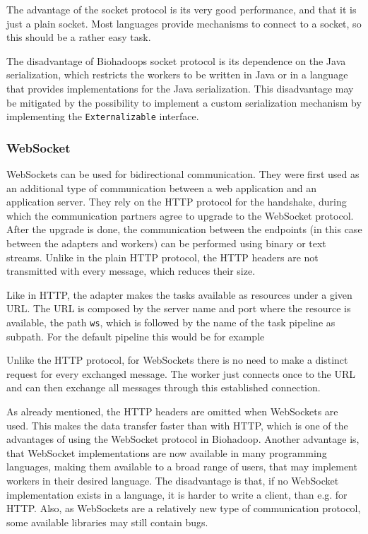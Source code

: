       The advantage of the socket protocol is its very good performance, and that it is just a plain socket. Most languages provide mechanisms to connect to a socket, so this should be a rather easy task.
      
      The disadvantage of Biohadoops socket protocol is its dependence on the Java serialization, which restricts the workers to be written in Java or in a language that provides implementations for the Java serialization. This disadvantage may be mitigated by the possibility to implement a custom serialization mechanism by implementing the \texttt{Externalizable} interface.
    \subsubsection{WebSocket}
      WebSockets can be used for bidirectional communication. They were first used as an additional type of communication between a web application and an application server. They rely on the HTTP protocol for the handshake, during which the communication partners agree to upgrade to the WebSocket protocol. After the upgrade is done, the communication between the endpoints (in this case between the adapters and workers) can be performed using binary or text streams. Unlike in the plain HTTP protocol, the HTTP headers are not transmitted with every message, which reduces their size.
      
      Like in HTTP, the adapter makes the tasks available as resources under a given URL. The URL is composed by the server name and port where the resource is available, the path \texttt{ws}, which is followed by the name of the task pipeline as subpath. For the default pipeline this would be for example 
      
      Unlike the HTTP protocol, for WebSockets there is no need to make a distinct request for every exchanged message. The worker just connects once to the URL and can then exchange all messages through this established connection.

      As already mentioned, the HTTP headers are omitted when WebSockets are used. This makes the data transfer faster than with HTTP, which is one of the advantages of using the WebSocket protocol in Biohadoop. Another advantage is, that WebSocket implementations are now available in many programming languages, making them available to a broad range of users, that may implement workers in their desired language. The disadvantage is that, if no WebSocket implementation exists in a language, it is harder to write a client, than e.g. for HTTP. Also, as WebSockets are a relatively new type of communication protocol, some available libraries may still contain bugs.
      
